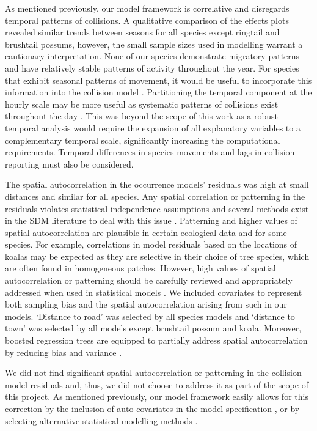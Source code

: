As mentioned previously, our model framework is correlative and disregards temporal patterns of collisions.  A qualitative comparison of the effects plots revealed similar trends between seasons for all species except ringtail and brushtail possums, however, the small sample sizes used in modelling warrant a cautionary interpretation. None of our species demonstrate migratory patterns and have relatively stable patterns of activity throughout the year. For species that exhibit seasonal patterns of movement, it would be useful to incorporate this information into the collision model \citep[see][]{neum12}. Partitioning the temporal component at the hourly scale may be more useful as systematic patterns of collisions exist throughout the day \citep[e.g.][]{litv08,rhod14}. This was beyond the scope of this work as a robust temporal analysis would require the expansion of all explanatory variables to a complementary temporal scale, significantly increasing the computational requirements.  Temporal differences in species movements and lags in collision reporting must also be considered.

The spatial autocorrelation in the occurrence models' residuals was high at small distances and similar for all species.  Any spatial correlation or patterning in the residuals violates statistical independence assumptions and several methods exist in the SDM literature to deal with this issue \citep[e.g.][]{augu96,dorm07,dorm13}.  Patterning and higher values of spatial autocorrelation are plausible in certain ecological data and for some species.  For example, correlations in model residuals based on the locations of koalas may be expected as they are selective in their choice of tree species, which are often found in homogeneous patches.  However, high values of spatial autocorrelation or patterning should be carefully reviewed and appropriately addressed when used in statistical models \citep{wint06}.  We included covariates to represent both sampling bias and the spatial autocorrelation arising from such in our models.  `Distance to road' was selected by all species models and `distance to town' was selected by all models except brushtail possum and koala.  Moreover, boosted regression trees are equipped to partially address spatial autocorrelation by reducing bias and variance \citep{elit08}.

We did not find significant spatial autocorrelation or patterning in the collision model residuals and, thus, we did not choose to address it as part of the scope of this project.  As mentioned previously, our model framework easily allows for this correction by the inclusion of auto-covariates in the model specification \citep[e.g.][]{dwye16,farm12,gome08}, or by selecting alternative statistical modelling methods \citep[e.g.][]{zhan05}.

